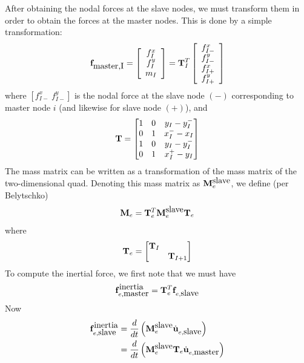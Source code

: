 \documentclass{article}
\begin{document}
After obtaining the nodal forces at the slave nodes, we must transform them in order to obtain the forces at the master nodes.
This is done by a simple transformation:
\begin{equation} {\bf f}_{\mbox{master,I}} = \left[ \begin{array}{c} f_I^x \\ f_I^y \\ m_I \end{array} \right] = {\bf T}_I^T \left[ \begin{array}{c} f_{I-}^x \\  f_{I-}^y \\ f_{I+}^x \\  f_{I+}^y \end{array} \right]  \label{eq:eq8200} \end{equation}
where $ \left[ f_{I-}^x \ f_{I-}^y \right]$ is the nodal force at the slave node $(-)$ corresponding to master node $i$ (and likewise for slave node $(+)$), and 
\begin{equation} {\bf T} = \begin{bmatrix} 
1 & 0 & y_I - y_I^- \\
0 & 1 & x_I^- - x_I \\
1 & 0 & y_I - y_I^- \\
0 & 1 & x_I^+ - y_I 
\end{bmatrix} \label{eq:eq8300} \end{equation}
The mass matrix can be written as a transformation of the mass matrix of the two-dimensional quad. 
Denoting this mass matrix as ${\bf M}^{\mbox{slave}}_e$, we define (per Belytschko)
\begin{equation} {\bf M}_e = {\bf T}_e^T {\bf M}^{\mbox{slave}}_e  {\bf T}_e  \label{eq:eq8400} \end{equation}
where
\begin{equation}  {\bf T}_e =  \begin{bmatrix}  
{\bf T}_I &  \\
            & {\bf T}_{I+1} 
\end{bmatrix}  \label{eq:eq8500} \end{equation}
To compute the inertial force, we first note that we must have
\begin{equation}  {\bf f}^{\mbox{inertia}}_{e, \mbox{master}} = {\bf T}_e^T{\bf f}_{e, \mbox{slave}} \label{eq:eq8600} \end{equation}
Now 
\begin{align}
{\bf f}^{\mbox{inertia}}_{e, \mbox{slave}} &= \frac{d}{dt}\left({\bf M}^{\mbox{slave}}_e \dot{\bf u}_{e,\mbox{slave}} \right) \nonumber \\
                          &= \frac{d}{dt}\left({\bf M}^{\mbox{slave}}_e {\bf T}_e \dot{\bf u}_{e,\mbox{master}} \right)
 \label{eq:eq8700}
\end{align}
\end{document}
